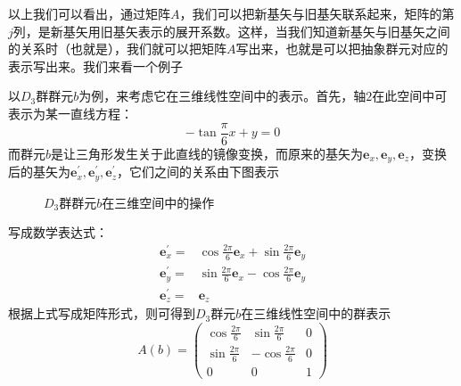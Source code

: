 以上我们可以看出，通过矩阵$A$，我们可以把新基矢与旧基矢联系起来，矩阵的第$j$列，是新基矢用旧基矢表示的展开系数。这样，当我们知道新基矢与旧基矢之间的关系时（也就是），我们就可以把矩阵$A$写出来，也就是可以把抽象群元对应的表示写出来。我们来看一个例子
\begin{example}
	以$D_3$群群元$b$为例，来考虑它在三维线性空间中的表示。首先，轴$2$在此空间中可表示为某一直线方程：
	\begin{equation}
	    -\tan \frac{\pi}{6} x + y = 0
	\end{equation} 
	而群元$b$是让三角形发生关于此直线的镜像变换，而原来的基矢为$\bm{e}_{x}, \bm{e}_{y}, \bm{e}_z$，变换后的基矢为$\bm{e}^{\prime}_x, \bm{e}^{\prime}_y,\bm{e}^{\prime}_z$，它们之间的关系由下图表示
	\begin{figure}[htbp]
		\centering
		\caption{$D_3$群群元$b$在三维空间中的操作}
	\end{figure}
	\newline
	写成数学表达式：
	\begin{equation}
	    \begin{aligned}
			\bm{e}_x^\prime =& \cos \frac{2\pi}{6} \bm{e}_x + \sin \frac{2\pi}{6} \bm{e}_y	\\
			\bm{e}_y^\prime =& \sin \frac{2\pi}{6} \bm{e}_x - \cos \frac{2\pi}{6} \bm{e}_y	\\
			\bm{e}_z^\prime =& \bm{e}_z
	    \end{aligned}
	\end{equation} 
	根据上式写成矩阵形式，则可得到$D_3$群元$b$在三维线性空间中的群表示
	\begin{equation}
	    A(b) =
		\begin{pmatrix}
			\cos \frac{2\pi}{6}	&	\sin \frac{2\pi}{6}		&	0	\\
			\sin \frac{2\pi}{6}	&	-\cos \frac{2\pi}{6}	&	0	\\
			0					&	0						&	1	
		\end{pmatrix}
	\end{equation} 
\end{example}

